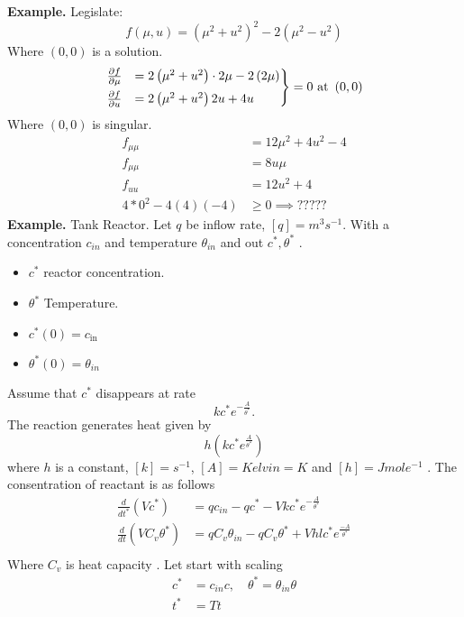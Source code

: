 \documentclass{article}
\theoremstyle{remark}
\begin{document}
\textbf{Example.}  Legislate: \[
f\left( \mu  , u \right) = \left( \mu ^2 + u^2 \right) ^2 - 2 \left( \mu ^2 - u^2 \right)
\] 
Where $\left( 0,0 \right)$ is a solution. \[
  \begin{rcases}
\frac{\partial f}{\partial \mu }   & = 2 \left( \mu ^2 + u^2 \right) \cdot 2 \mu  - 2 \left( 2 \mu   \right) \\
\frac{\partial f}{\partial u}  &=  2 \left( \mu ^2 + u^2  \right) 2u + 4 u  \\
  \end{rcases}
  = 0 \text{ at } \left( 0,0 \right)
\] 
Where $\left( 0,0 \right)$ is singular. \[
\begin{split}
  f_{\mu \mu } &=  12 \mu ^2 + 4 u^2 - 4 \\
  f_{\mu \mu }  & = 8 u \mu  \\
 f_{uu } &=  12  u ^2 + 4 \\ 
 4 * 0 ^2 - 4 \left( 4 \right) \left( -4 \right)   & \ge 0  \implies  \text{?????}
\end{split} 
\] 
\textbf{Example.} Tank Reactor.  Let $q $ be inflow rate, $\left[ q \right] = m^3 s^{-1}$. With a concentration $c_{in} $ and temperature $\theta _{in}$ and out $c ^{*} , \theta ^{*}$ . 
\begin{itemize}
  \item $c^{*}$ reactor concentration.
  \item  $\theta ^{*}$ Temperature. 
  \item $c^{*}\left( 0 \right) = c_{\text{in}}$
  \item $\theta ^{*}\left( 0 \right) = \theta _{in}$
\end{itemize}
Assume that $c ^{*}$ disappears at rate 
\[
kc ^{* } e ^{ -\frac{A}{\theta ^{*}}} .
\] 
The reaction generates heat given by \[
h\left( kc^{*}e^{\frac{A}{\theta ^{*}}} \right)
\] 
where $h$ is a constant,   $\left[ k \right] = s^{-1}$, $\left[ A \right]= Kelvin = K$ and  $\left[ h \right] = J mole ^{-1} $ . The consentration of reactant is as follows \[
  \begin{split}
\frac{d }{d t^{*}}  \left( V c^{*} \right) &=  q c_{in} - q c ^{*} - Vk c^{*} e^{- \frac{A }{ \theta ^{*}} } \\
\frac{d }{d t} \left( V C_{v} \theta ^{*} \right) &=  qC_{v} \theta _{in} - q C_{v} \theta ^{*} + V hl c^{*} e^{\frac{-A}{\theta ^{*}} } \\
  \end{split} 
\]  
Where $C_{v} $ is heat capacity .   Let start with scaling \[
  \begin{split}
  c^{* }   & = c_{in} c , \quad  \theta ^{*} = \theta _{in} \theta  \\
  t^{*} &=  Tt \\
  \end{split} 
\] 
\end{document}

